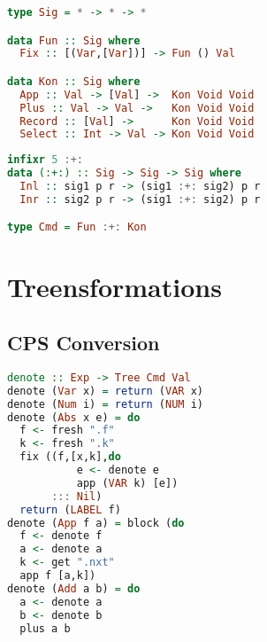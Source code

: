 \begin{lstlisting}[language=Haskell]
type Sig = * -> * -> *

data Fun :: Sig where
  Fix :: [(Var,[Var])] -> Fun () Val

data Kon :: Sig where
  App :: Val -> [Val] ->  Kon Void Void
  Plus :: Val -> Val ->   Kon Void Void
  Record :: [Val] ->      Kon Void Void
  Select :: Int -> Val -> Kon Void Void
\end{lstlisting}

\begin{lstlisting}[language=Haskell]
infixr 5 :+:
data (:+:) :: Sig -> Sig -> Sig where
  Inl :: sig1 p r -> (sig1 :+: sig2) p r
  Inr :: sig2 p r -> (sig1 :+: sig2) p r

type Cmd = Fun :+: Kon
\end{lstlisting}

\section{\label{section:treensforms}Treensformations}
\subsection{\label{subsection:cpsconvert}CPS Conversion}
\begin{lstlisting}[language=Haskell]
denote :: Exp -> Tree Cmd Val
denote (Var x) = return (VAR x)
denote (Num i) = return (NUM i)
denote (Abs x e) = do
  f <- fresh ".f"
  k <- fresh ".k"
  fix ((f,[x,k],do
           e <- denote e
           app (VAR k) [e])
       ::: Nil)
  return (LABEL f)
denote (App f a) = block (do
  f <- denote f
  a <- denote a
  k <- get ".nxt"
  app f [a,k])
denote (Add a b) = do
  a <- denote a
  b <- denote b
  plus a b
\end{lstlisting}

